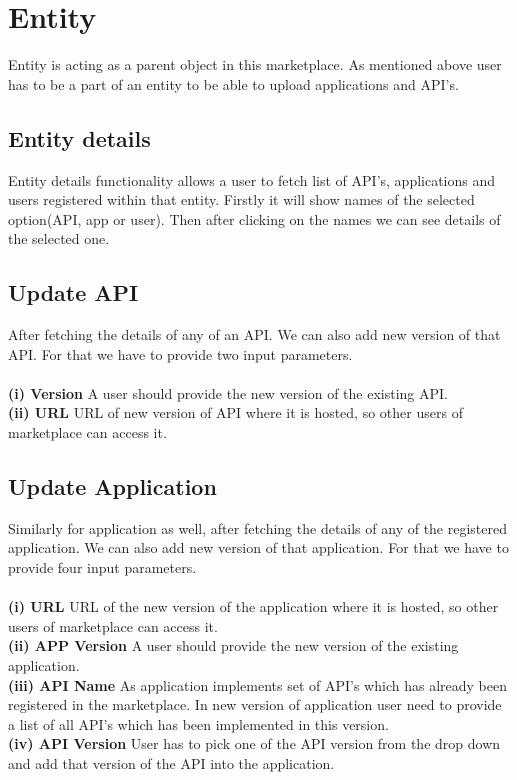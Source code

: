 \section{Entity} Entity is acting as a parent object in this marketplace. As mentioned above user has to be a part of an entity to be able to upload applications and API's.\\

\subsection {Entity details}
Entity details functionality allows a user to fetch list of API's, applications and users registered within that entity. Firstly it will show names of the selected option(API, app or user). Then after clicking on the names we can see details of the selected one.\\

\subsection {Update API}
After fetching the details of any of an API. We can also add new version of that API. For that we have to provide two input parameters.\\\\
\textbf{(i) Version}
A user should provide the new version of the existing API.\\
\textbf{(ii) URL}
URL of new version of API where it is hosted, so other users of marketplace can access it.\\

\subsection {Update Application}
Similarly for application as well, after fetching the details of any of the registered application. We can also add new version of that application. For that we have to provide four input parameters.\\\\
\textbf{(i) URL}
URL of the new version of the application where it is hosted, so other users of marketplace can access it.\\
\textbf{(ii) APP Version}
A user should provide the new version of the existing application.\\
\textbf{(iii) API Name}
As application implements set of API's which has already been registered in the marketplace. In new version of application user need to provide a list of all API's which has been implemented in this version.\\
\textbf{(iv) API Version}
User has to pick one of the API version from the drop down and add that version of the API into the application.\\

